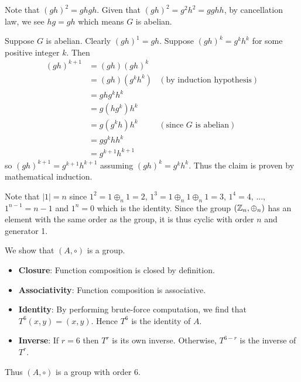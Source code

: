 \begin{questions}
    \item \begin{partquestions}{\alph*}
        \item Note that $(gh)^2 = ghgh$. Given that $(gh)^2 = g^2h^2 = gghh$, by cancellation law, we see $hg = gh$ which means $G$ is abelian.

        \item Suppose $G$ is abelian. Clearly $(gh)^1 = gh$. Suppose $(gh)^{k} = g^kh^k$ for some positive integer $k$. Then
        \begin{align*}
            (gh)^{k+1} &= (gh)(gh)^k\\
            &= (gh)(g^kh^k) & (\text{by induction hypothesis})\\
            &= ghg^kh^k\\
            &= g(hg^k)h^k\\
            &= g(g^kh)h^k & (\text{since } G \text{ is abelian})\\
            &= gg^khh^k\\
            &= g^{k+1}h^{k+1}
        \end{align*}
        so $(gh)^{k+1} = g^{k+1}h^{k+1}$ assuming $(gh)^k = g^kh^k$. Thus the claim is proven by mathematical induction.
    \end{partquestions}

    \item Note that $|1| = n$ since $1^2 = 1 \oplus_n 1 = 2$, $1^3 = 1 \oplus_n 1 \oplus_n 1 = 3$, $1^4 = 4$, ..., $1^{n-1} = n-1$ and $1^n = 0$ which is the identity. Since the group $(\mathbb{Z}_n, \oplus_n)$ has an element with the same order as the group, it is thus cyclic with order $n$ and generator 1.

    \item We show that $(A, \circ)$ is a group.
    \begin{itemize}
            \item \textbf{Closure}: Function composition is closed by definition.
            \item \textbf{Associativity}: Function composition is associative.
            \item \textbf{Identity}: By performing brute-force computation, we find that $T^6(x, y) = (x, y)$. Hence $T^6$ is the identity of $A$.
            \item \textbf{Inverse}: If $r = 6$ then $T^r$ is its own inverse. Otherwise, $T^{6-r}$ is the inverse of $T^r$.
    \end{itemize}
    Thus $(A, \circ)$ is a group with order 6.
\end{questions}

